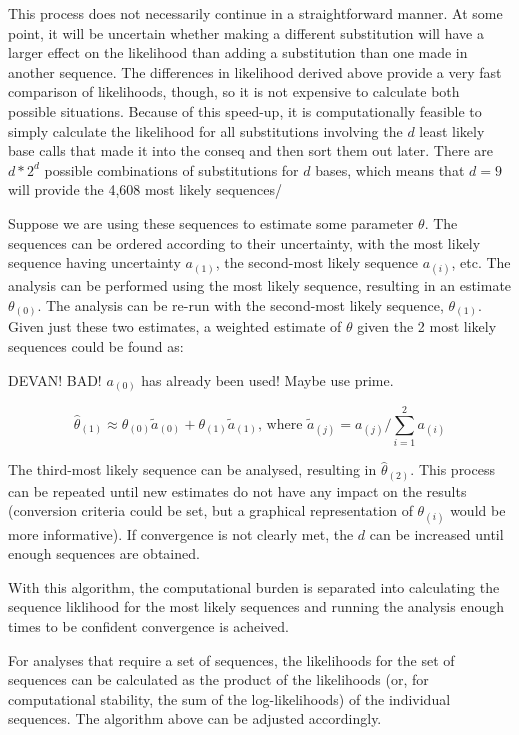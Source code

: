 \documentclass[
]{article}
\begin{document}
This process does not necessarily continue in a straightforward manner.
At some point, it will be uncertain whether making a different
substitution will have a larger effect on the likelihood than adding a
substitution than one made in another sequence. The differences in
likelihood derived above provide a very fast comparison of likelihoods,
though, so it is not expensive to calculate both possible situations.
Because of this speed-up, it is computationally feasible to simply
calculate the likelihood for all substitutions involving the \(d\) least
likely base calls that made it into the conseq and then sort them out
later. There are \(d*2^d\) possible combinations of substitutions for
\(d\) bases, which means that \(d=9\) will provide the 4,608 most likely
sequences/

Suppose we are using these sequences to estimate some parameter
\(\theta\). The sequences can be ordered according to their uncertainty,
with the most likely sequence having uncertainty \(a_{(1)}\), the
second-most likely sequence \(a_{(i)}\), etc. The analysis can be
performed using the most likely sequence, resulting in an estimate
\(\theta_{(0)}\). The analysis can be re-run with the second-most likely
sequence, \(\theta_{(1)}\). Given just these two estimates, a weighted
estimate of \(\theta\) given the 2 most likely sequences could be found
as:

DEVAN! BAD! \(a_{(0)}\) has already been used! Maybe use prime.

\[
\hat\theta_{(1)} \approx \theta_{(0)} \tilde a_{(0)} + \theta_{(1)}\tilde a_{(1)}\text{, where }\tilde a_{(j)}=a_{(j)}/\sum_{i=1}^2a_{(i)}
\]

The third-most likely sequence can be analysed, resulting in
\(\hat\theta_{(2)}\). This process can be repeated until new estimates
do not have any impact on the results (conversion criteria could be set,
but a graphical representation of \(\theta_{(i)}\) would be more
informative). If convergence is not clearly met, the \(d\) can be
increased until enough sequences are obtained.

With this algorithm, the computational burden is separated into
calculating the sequence liklihood for the most likely sequences and
running the analysis enough times to be confident convergence is
acheived.

For analyses that require a set of sequences, the likelihoods for the
set of sequences can be calculated as the product of the likelihoods
(or, for computational stability, the sum of the log-likelihoods) of the
individual sequences. The algorithm above can be adjusted accordingly.
\end{document}
